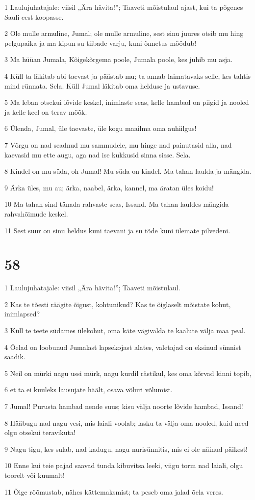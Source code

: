 \par 1 Laulujuhatajale: viisil „Ära hävita!”; Taaveti mõistulaul ajast, kui ta põgenes Sauli eest koopasse.
\par 2 Ole mulle armuline, Jumal; ole mulle armuline, sest sinu juures otsib mu hing pelgupaika ja ma kipun su tiibade varju, kuni õnnetus möödub!
\par 3 Ma hüüan Jumala, Kõigekõrgema poole, Jumala poole, kes juhib mu asja.
\par 4 Küll ta läkitab abi taevast ja päästab mu; ta annab laimatavaks selle, kes tahtis mind rünnata. Sela. Küll Jumal läkitab oma helduse ja ustavuse.
\par 5 Ma leban otsekui lõvide keskel, inimlaste seas, kelle hambad on piigid ja nooled ja kelle keel on terav mõõk.
\par 6 Ülenda, Jumal, üle taevaste, üle kogu maailma oma auhiilgus!
\par 7 Võrgu on nad seadnud mu sammudele, mu hinge nad painutasid alla, nad kaevasid mu ette augu, aga nad ise kukkusid sinna sisse. Sela.
\par 8 Kindel on mu süda, oh Jumal! Mu süda on kindel. Ma tahan laulda ja mängida.
\par 9 Ärka üles, mu au; ärka, naabel, ärka, kannel, ma äratan üles koidu!
\par 10 Ma tahan sind tänada rahvaste seas, Issand. Ma tahan lauldes mängida rahvahõimude keskel.
\par 11 Sest suur on sinu heldus kuni taevani ja su tõde kuni ülemate pilvedeni.

\chapter{58}

\par 1 Laulujuhatajale: viisil „Ära hävita!”; Taaveti mõistulaul.
\par 2 Kas te tõesti räägite õigust, kohtunikud? Kas te õiglaselt mõistate kohut, inimlapsed?
\par 3 Küll te teete südames ülekohut, oma käte vägivalda te kaalute välja maa peal.
\par 4 Õelad on loobunud Jumalast lapsekojast alates, valetajad on eksinud sünnist saadik.
\par 5 Neil on mürki nagu ussi mürk, nagu kurdil rästikul, kes oma kõrvad kinni topib,
\par 6 et ta ei kuuleks lausujate häält, osava võluri võlumist.
\par 7 Jumal! Purusta hambad nende suus; kisu välja noorte lõvide hambad, Issand!
\par 8 Hääbugu nad nagu vesi, mis laiali voolab; lasku ta välja oma nooled, kuid need olgu otsekui teravikuta!
\par 9 Nagu tigu, kes sulab, nad kadugu, nagu nurisünnitis, mis ei ole näinud päikest!
\par 10 Enne kui teie pajad saavad tunda kibuvitsa leeki, viigu torm nad laiali, olgu toorelt või kuumalt!
\par 11 Õige rõõmustab, nähes kättemaksmist; ta peseb oma jalad õela veres.

